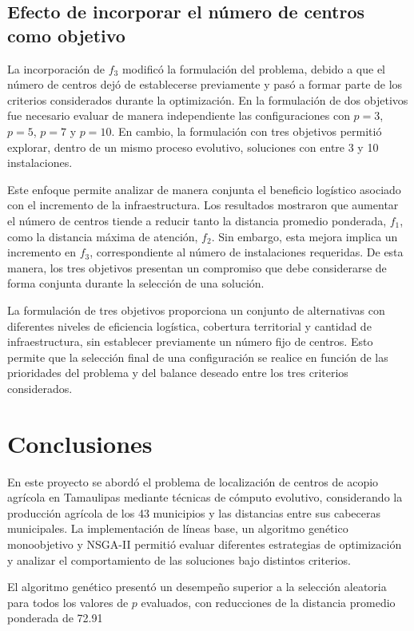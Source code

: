 \documentclass[journal]{IEEEtran}
\begin{document}
\subsection{Efecto de incorporar el número de centros como objetivo}

La incorporación de $f_3$ modificó la formulación del problema, debido a que el número de centros dejó de establecerse previamente y pasó a formar parte de los criterios considerados durante la optimización. En la formulación de dos objetivos fue necesario evaluar de manera independiente las configuraciones con $p=3$, $p=5$, $p=7$ y $p=10$. En cambio, la formulación con tres objetivos permitió explorar, dentro de un mismo proceso evolutivo, soluciones con entre 3 y 10 instalaciones.

Este enfoque permite analizar de manera conjunta el beneficio logístico asociado con el incremento de la infraestructura. Los resultados mostraron que aumentar el número de centros tiende a reducir tanto la distancia promedio ponderada, $f_1$, como la distancia máxima de atención, $f_2$. Sin embargo, esta mejora implica un incremento en $f_3$, correspondiente al número de instalaciones requeridas. De esta manera, los tres objetivos presentan un compromiso que debe considerarse de forma conjunta durante la selección de una solución.

La formulación de tres objetivos proporciona un conjunto de alternativas con diferentes niveles de eficiencia logística, cobertura territorial y cantidad de infraestructura, sin establecer previamente un número fijo de centros. Esto permite que la selección final de una configuración se realice en función de las prioridades del problema y del balance deseado entre los tres criterios considerados.

\section{Conclusiones}

En este proyecto se abordó el problema de localización de centros de acopio agrícola en Tamaulipas mediante técnicas de cómputo evolutivo, considerando la producción agrícola de los 43 municipios y las distancias entre sus cabeceras municipales. La implementación de líneas base, un algoritmo genético monoobjetivo y NSGA-II permitió evaluar diferentes estrategias de optimización y analizar el comportamiento de las soluciones bajo distintos criterios.

El algoritmo genético presentó un desempeño superior a la selección aleatoria para todos los valores de $p$ evaluados, con reducciones de la distancia promedio ponderada de 72.91%
\end{document}
